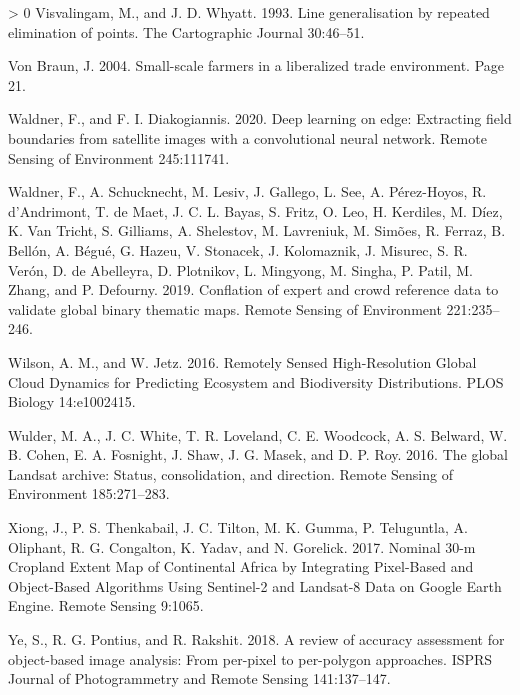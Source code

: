 \documentclass[11pt,a4paper]{article}
\newlength{\cslhangindent}
\newenvironment{CSLReferences}[3] %
 {%
  \setlength{\parindent}{0pt}
  \ifodd #1 \everypar{\setlength{\hangindent}{\cslhangindent}}\ignorespaces\fi
  \ifnum #2 > 0
  \setlength{\parskip}{#2\baselineskip}
  \fi
 }%
 {}
\begin{document}
\begin{CSLReferences}{1}{0}
\leavevmode\hypertarget{ref-visvalingamLineGeneralisationRepeated1993}{}%
Visvalingam, M., and J. D. Whyatt. 1993. Line generalisation by repeated
elimination of points. The Cartographic Journal 30:46--51.

\leavevmode\hypertarget{ref-VonBraunSmallscalefarmersliberalized2004}{}%
Von Braun, J. 2004. Small-scale farmers in a liberalized trade
environment. Page 21.

\leavevmode\hypertarget{ref-waldnerDeepLearningEdge2020}{}%
Waldner, F., and F. I. Diakogiannis. 2020. Deep learning on edge:
{Extracting} field boundaries from satellite images with a convolutional
neural network. Remote Sensing of Environment 245:111741.

\leavevmode\hypertarget{ref-WaldnerConflationexpertcrowd2019}{}%
Waldner, F., A. Schucknecht, M. Lesiv, J. Gallego, L. See, A.
Pérez-Hoyos, R. d'Andrimont, T. de Maet, J. C. L. Bayas, S. Fritz, O.
Leo, H. Kerdiles, M. Díez, K. Van Tricht, S. Gilliams, A. Shelestov, M.
Lavreniuk, M. Simões, R. Ferraz, B. Bellón, A. Bégué, G. Hazeu, V.
Stonacek, J. Kolomaznik, J. Misurec, S. R. Verón, D. de Abelleyra, D.
Plotnikov, L. Mingyong, M. Singha, P. Patil, M. Zhang, and P. Defourny.
2019. Conflation of expert and crowd reference data to validate global
binary thematic maps. Remote Sensing of Environment 221:235--246.

\leavevmode\hypertarget{ref-WilsonRemotelySensedHighResolution2016}{}%
Wilson, A. M., and W. Jetz. 2016. Remotely {Sensed High}-{Resolution
Global Cloud Dynamics} for {Predicting Ecosystem} and {Biodiversity
Distributions}. PLOS Biology 14:e1002415.

\leavevmode\hypertarget{ref-WulderglobalLandsatarchive2016}{}%
Wulder, M. A., J. C. White, T. R. Loveland, C. E. Woodcock, A. S.
Belward, W. B. Cohen, E. A. Fosnight, J. Shaw, J. G. Masek, and D. P.
Roy. 2016. The global {Landsat} archive: {Status}, consolidation, and
direction. Remote Sensing of Environment 185:271--283.

\leavevmode\hypertarget{ref-XiongNominal30mCropland2017}{}%
Xiong, J., P. S. Thenkabail, J. C. Tilton, M. K. Gumma, P. Teluguntla,
A. Oliphant, R. G. Congalton, K. Yadav, and N. Gorelick. 2017. Nominal
30-m {Cropland Extent Map} of {Continental Africa} by {Integrating
Pixel}-{Based} and {Object}-{Based Algorithms Using Sentinel}-2 and
{Landsat}-8 {Data} on {Google Earth Engine}. Remote Sensing 9:1065.

\leavevmode\hypertarget{ref-yeReviewAccuracyAssessment2018}{}%
Ye, S., R. G. Pontius, and R. Rakshit. 2018. A review of accuracy
assessment for object-based image analysis: {From} per-pixel to
per-polygon approaches. ISPRS Journal of Photogrammetry and Remote
Sensing 141:137--147.


\end{CSLReferences}
\end{document}
